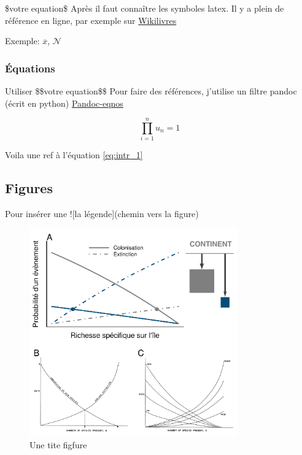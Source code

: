 \$votre equation\$ Après il faut connaître les symboles latex. Il y a
plein de référence en ligne, par exemple sur
\href{https://en.wikibooks.org/wiki/LaTeX/Mathematics}{Wikilivres}

Exemple: \(\overline{x}\), \(\mathcal{N}\)

\subsubsection*{Équations}\label{uxe9quations}

Utiliser \$\$votre equation\$\$ Pour faire des références, j'utilise un
filtre pandoc (écrit en python)
\href{https://github.com/tomduck/pandoc-eqnos}{Pandoc-eqnos}

\begin{equation}\prod_{i=1}^nu_n=1\label{eq:intr_1}\end{equation}

Voila une ref à l'équation \ref{eq:intr_1}

\subsection*{Figures}\label{figures}

Pour insérer une !{[}la légende{]}(chemin vers la figure)

\begin{figure}[htbp]
\centering
\includegraphics[width=0.80000\textwidth]{fig/fig1.pdf}
\caption{Une tite figfure\label{fig:intr1}}
\end{figure}

